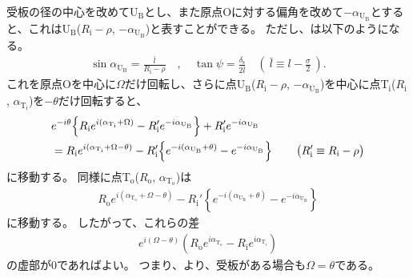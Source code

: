 受板の径の中心を改めてU$_\mathrm B$とし、また原点Oに対する偏角を改めて$-\alpha_{\mathrm U_\mathrm B}$とすると、これはU$_\mathrm B$($R_\mathrm i-\rho$, $-\alpha_{\mathrm U_\mathrm B}$)と表すことができる。
ただし、は以下のようになる。
\begin{align*}
  \sin\alpha_{\mathrm U_\mathrm B} = \frac{\bar l}{R_\mathrm i-\rho}\quad, \quad
  \tan\psi = \frac{\delta_\mathrm s}{2\bar l} \quad
  \left(~\bar l \equiv l-\frac\sigma2~\right).
\end{align*}
これを原点Oを中心に$\Omega$だけ回転し、さらに点U$_\mathrm B$($R_\mathrm i-\rho$, $-\alpha_{\mathrm U_\mathrm B}$)を中心に点T$_\mathrm i$($R_\mathrm i$, $\alpha_{\mathrm T_\mathrm i}$)を$-\theta$だけ回転すると、
\begin{align}
  \notag
  & e^{-i\theta}\!
    \left\{R_\mathrm ie^{i(\alpha_{\mathrm T_\mathrm i}+\Omega)}
           -R_\mathrm i'e^{-i\alpha_{\mathrm U_\mathrm B}}\right\}
    +R_\mathrm i'e^{-i\alpha_{\mathrm U_\mathrm B}}\\
  & = R_\mathrm ie^{i(\alpha_{\mathrm T_\mathrm i}+\Omega-\theta)}
      -R_\mathrm i'\!
       \left\{e^{-i(\alpha_{\mathrm U_\mathrm B}+\theta)}-e^{-i\alpha_{\mathrm U_\mathrm B}}\right\}\qquad
    \big(R_\mathrm i' \equiv R_\mathrm i-\rho\big)
    \label{eq:afterftUfinite}
\end{align}
に移動する。
同様に点T$_\mathrm o$($R_\mathrm o$, $\alpha_{\mathrm T_\mathrm o}$)は
\begin{align*}
  R_\mathrm oe^{i(\alpha_{\mathrm T_\mathrm o}+\Omega-\theta)}
  -R_\mathrm i'\!
   \left\{e^{-i(\alpha_{\mathrm U_\mathrm B} + \theta)} - e^{-i\alpha_{\mathrm U_\mathrm B}}\right\}
\end{align*}
に移動する。
したがって、これらの差
\begin{align*}
  e^{i(\Omega-\theta)}
  \left(R_\mathrm oe^{i\alpha_{\mathrm T_\mathrm o}} - R_\mathrm ie^{i\alpha_{\mathrm T_\mathrm i}}\right)
\end{align*}
の虚部が$0$であればよい。
つまり、より、受板がある場合も$\Omega = \theta$である。


